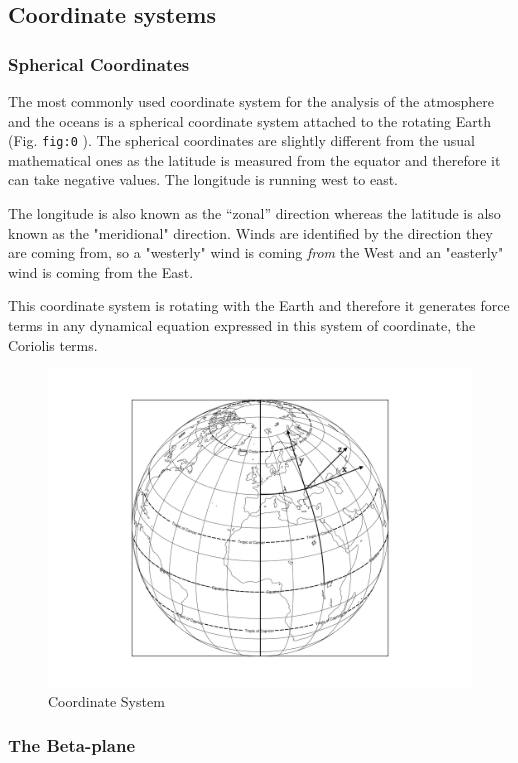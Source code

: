 \subsection{Coordinate systems}\label{coordinate-systems}

\subsubsection{Spherical Coordinates}\label{spherical-coordinates}

The most commonly used coordinate system for the analysis of the
atmosphere and the oceans is a spherical coordinate system attached to
the rotating Earth (Fig. \texttt{fig:0} ). The spherical coordinates are
slightly different from the usual mathematical ones as the latitude is
measured from the equator and therefore it can take negative values. The
longitude is running west to east.

The longitude is also known as the ``zonal'' direction whereas the
latitude is also known as the "meridional" direction. Winds are
identified by the direction they are coming from, so a "westerly" wind
is coming \emph{from} the West and an "easterly" wind is coming from the
East.

This coordinate system is rotating with the Earth and therefore it
generates force terms in any dynamical equation expressed in this system
of coordinate, the Coriolis terms.

\begin{figure}
\centering
\includegraphics[width = .7 \textwidth]{figs/GD/map.png}
\caption{Coordinate System}
\label{fig:3d-coordinate-system}
\end{figure}

\subsubsection{The Beta-plane}\label{the-beta-plane}

